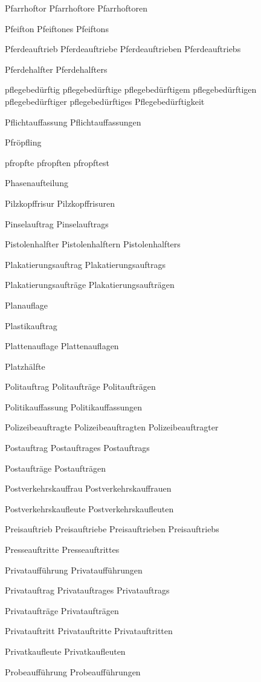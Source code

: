 Pfarrhoftor
Pfarrhoftore
Pfarrhoftoren

Pfeifton
Pfeiftones
Pfeiftons

Pferdeauftrieb
Pferdeauftriebe
Pferdeauftrieben
Pferdeauftriebs

Pferdehalfter
Pferdehalfters

pflegebedürftig
pflegebedürftige
pflegebedürftigem
pflegebedürftigen
pflegebedürftiger
pflegebedürftiges
Pflegebedürftigkeit

Pflichtauffassung
Pflichtauffassungen

Pfröpfling

pfropfte
pfropften
pfropftest

Phasenaufteilung

Pilzkopffrisur
Pilzkopffrisuren

Pinselauftrag
Pinselauftrags

Pistolenhalfter
Pistolenhalftern
Pistolenhalfters

Plakatierungsauftrag
Plakatierungsauftrags

Plakatierungsaufträge
Plakatierungsaufträgen

Planauflage

Plastikauftrag

Plattenauflage
Plattenauflagen

Platzhälfte

Politauftrag
Politaufträge
Politaufträgen

Politikauffassung
Politikauffassungen

Polizeibeauftragte
Polizeibeauftragten
Polizeibeauftragter

Postauftrag
Postauftrages
Postauftrags

Postaufträge
Postaufträgen

Postverkehrskauffrau
Postverkehrskauffrauen

Postverkehrskaufleute
Postverkehrskaufleuten

Preisauftrieb
Preisauftriebe
Preisauftrieben
Preisauftriebs

Presseauftritte
Presseauftrittes

Privataufführung
Privataufführungen

Privatauftrag
Privatauftrages
Privatauftrags

Privataufträge
Privataufträgen

Privatauftritt
Privatauftritte
Privatauftritten

Privatkaufleute
Privatkaufleuten

Probeaufführung
Probeaufführungen

